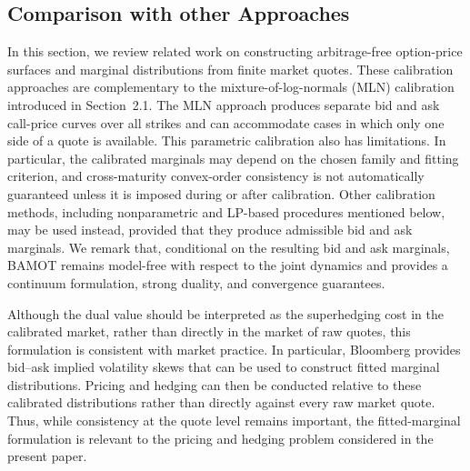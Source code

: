 \documentclass[11pt]{article}
\theoremstyle{plain}
\theoremstyle{definition}
\theoremstyle{remark}
\theoremstyle{plain}
\begin{document}
%
%

%



\subsection{Comparison with other Approaches}
In this section, we review related work on constructing arbitrage-free option-price surfaces and marginal distributions from finite market quotes. These calibration approaches are complementary to the mixture-of-log-normals (MLN) calibration introduced in Section~2.1. The MLN approach produces separate bid and ask call-price curves over all strikes and can accommodate cases in which only one side of a quote is available. This parametric calibration also has limitations. In particular, the calibrated marginals may depend on the chosen family and fitting criterion, and cross-maturity convex-order consistency is not automatically guaranteed unless it is imposed during or after calibration. Other calibration methods, including nonparametric and LP-based procedures mentioned below, may be used instead, provided that they produce admissible bid and ask marginals. We remark that, conditional on the resulting bid and ask marginals, BAMOT remains model-free with respect to the joint dynamics and provides a continuum formulation, strong duality, and convergence guarantees. 

Although the dual value should be interpreted as the superhedging cost in the calibrated market, rather than directly in the market of raw quotes, this formulation is consistent with market practice. In particular, Bloomberg provides bid--ask implied volatility skews that can be used to construct fitted marginal distributions. Pricing and hedging can then be conducted relative to these calibrated distributions rather than directly against every raw market quote. Thus, while consistency at the quote level remains important, the fitted-marginal formulation is relevant to the pricing and hedging problem considered in the present paper.
\end{document}
